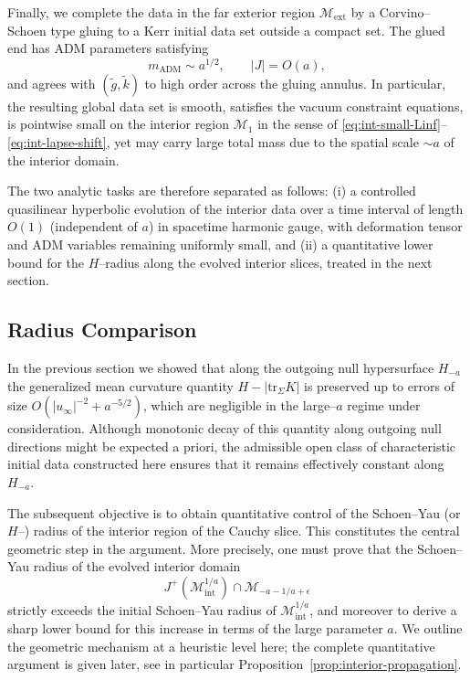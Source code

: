 \documentclass{amsart}
\newcommand{\tr}{\mbox{tr}}
\begin{document}
\medskip

\noindent Finally, we complete the data in the far exterior region $\mathcal M_{\mathrm{ext}}$ by a Corvino--Schoen type
gluing to a Kerr initial data set outside a compact set. The glued end has ADM parameters satisfying
\[
m_{\mathrm{ADM}}\sim a^{1/2},
\qquad
|J|=O(a),
\]
and agrees with $(\tilde g,\tilde k)$ to high order across the gluing annulus. In particular, the resulting global
data set is smooth, satisfies the vacuum constraint equations, is pointwise small on the interior region
$\mathcal M_{1}$ in the sense of \eqref{eq:int-small-Linf}--\eqref{eq:int-lapse-shift}, yet may carry large total
mass due to the spatial scale $\sim a$ of the interior domain.

\medskip

\noindent The two analytic tasks are therefore separated as follows: (i) a controlled quasilinear hyperbolic evolution of
the interior data over a time interval of length $O(1)$ (independent of $a$) in spacetime harmonic gauge, with deformation tensor and
ADM variables remaining uniformly small, and (ii) a quantitative lower bound for the $H$--radius along the evolved
interior slices, treated in the next section.


\subsection{Radius Comparison} 
\label{radius}
In the previous section we showed that along the outgoing null hypersurface $H_{-a}$ the generalized mean curvature quantity $H-|\tr_{\Sigma}K|$ is preserved up to errors of size $O(|u_{\infty}|^{-2}+a^{-5/2})$, which are negligible in the large–$a$ regime under consideration. Although monotonic decay of this quantity along outgoing null directions might be expected a priori, the admissible open class of characteristic initial data constructed here ensures that it remains effectively constant along $H_{-a}$.

\noindent The subsequent objective is to obtain quantitative control of the Schoen–Yau (or $H$–) radius of the interior region of the Cauchy slice. This constitutes the central geometric step in the argument. More precisely, one must prove that the Schoen–Yau radius of the evolved interior domain
\[
J^{+}(\mathcal{M}^{1/a}_{\mathrm{int}})\cap \mathcal{M}_{-a-1/a+\epsilon}
\]
strictly exceeds the initial Schoen–Yau radius of $\mathcal{M}^{1/a}_{\mathrm{int}}$, and moreover to derive a sharp lower bound for this increase in terms of the large parameter $a$. We outline the geometric mechanism at a heuristic level here; the complete quantitative argument is given later, see in particular Proposition~\ref{prop:interior-propagation}.
\end{document}

